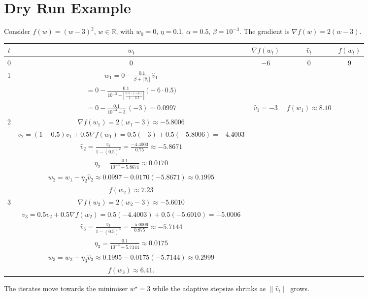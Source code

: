 \documentclass{article}
\begin{document}
\section*{Dry Run Example}
Consider $f(w)=(w-3)^2$, $w\in\mathbb{R}$, with $w_0=0$, $\eta=0.1$, $\alpha=0.5$, $\beta=10^{-3}$.
The gradient is $\nabla f(w)=2(w-3)$.

\begin{center}
\begin{tabular}{c|c|c|c|c}
$t$ & $w_t$ & $\nabla f(w_t)$ & $\hat v_t$ & $f(w_t)$\\ \hline
0 & $0$ & $-6$ & $0$ & $9$\\
1 & $w_1 = 0-\frac{0.1}{\beta+|\,\hat v_1|}\,\hat v_1$ \\
   & $=0-\frac{0.1}{10^{-3}+|\,\tfrac{0.5\cdot(-6)}{1-0.5}|}\,\bigl(-6\cdot0.5\bigr)$ \\
   & $=0-\frac{0.1}{10^{-3}+3}\,(-3)=0.0997$ & $\hat v_1=-3$ & $f(w_1)\approx8.10$\\ \hline
2 & $\nabla f(w_1)=2(w_1-3)\approx-5.8006$\\
   & $v_2=(1-0.5) v_1+0.5\nabla f(w_1)=0.5(-3)+0.5(-5.8006)=-4.4003$\\
   & $\hat v_2=\frac{v_2}{1-(0.5)^2}= \frac{-4.4003}{0.75}\approx-5.8671$\\
   & $\eta_2=\frac{0.1}{10^{-3}+5.8671}\approx0.0170$\\
   & $w_2=w_1-\eta_2\hat v_2\approx0.0997-0.0170(-5.8671)\approx0.1995$\\
   & $f(w_2)\approx7.23$\\ \hline
3 & $\nabla f(w_2)=2(w_2-3)\approx-5.6010$\\
   & $v_3=0.5v_2+0.5\nabla f(w_2)=0.5(-4.4003)+0.5(-5.6010)=-5.0006$\\
   & $\hat v_3=\frac{v_3}{1-(0.5)^3}= \frac{-5.0006}{0.875}\approx-5.7144$\\
   & $\eta_3=\frac{0.1}{10^{-3}+5.7144}\approx0.0175$\\
   & $w_3=w_2-\eta_3\hat v_3\approx0.1995-0.0175(-5.7144)\approx0.2999$\\
   & $f(w_3)\approx6.41$.
\end{tabular}
\end{center}
The iterates move towards the minimiser $w^\star=3$ while the adaptive stepsize
shrinks as $\|\hat v_t\|$ grows.

\newpage
\end{document}
